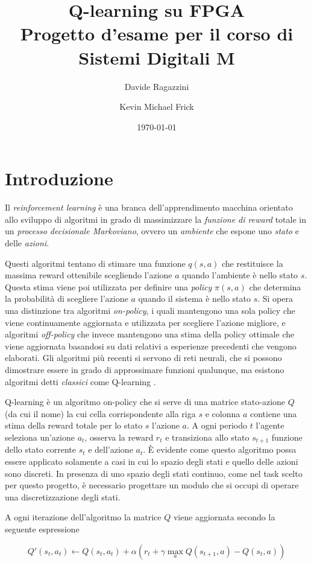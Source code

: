 \documentclass{article}
\title{Q-learning su FPGA \\ Progetto d'esame per il corso di Sistemi Digitali M}
\date{\today}
\author{Davide Ragazzini \and Kevin Michael Frick}
\begin{document}
\maketitle

\section{Introduzione}
Il \emph{reinforcement learning} è una branca dell'apprendimento macchina orientato allo sviluppo di algoritmi in grado di massimizzare la \emph{funzione di reward} totale in un \emph{processo decisionale Markoviano}, ovvero un \emph{ambiente} che espone uno \emph{stato} e delle \emph{azioni}. 

Questi algoritmi tentano di stimare una funzione $q(s, a)$ che restituisce la massima reward ottenibile scegliendo l'azione $a$ quando l'ambiente è nello stato $s$.
Questa stima viene poi utilizzata per definire una \emph{policy} $\pi(s, a)$ che determina la probabilità di scegliere l'azione $a$ quando il sistema è nello stato $s$. 
Si opera una distinzione tra algoritmi \emph{on-policy}, i quali mantengono una sola policy che viene continuamente aggiornata e utilizzata per scegliere l'azione migliore, e algoritmi \emph{off-policy} che invece mantengono una stima della policy ottimale che viene aggiornata basandosi su dati relativi a esperienze precedenti che vengono elaborati. 
Gli algoritmi più recenti si servono di reti neurali, che si possono dimostrare essere in grado di approssimare funzioni qualunque, ma esistono algoritmi detti \emph{classici} come Q-learning \citep{watkins_learning_1989}. 

Q-learning è un algoritmo on-policy che si serve di una matrice stato-azione $Q$ (da cui il nome) la cui cella corrispondente alla riga $s$ e colonna $a$ contiene una stima della reward totale per lo stato $s$ l'azione $a$. 
A ogni periodo $t$ l'agente seleziona un'azione $a_t$, osserva la reward $r_t$ e transiziona allo stato $s_{t + 1}$ funzione dello stato corrente $s_t$ e dell'azione $a_t$. 
È evidente come questo algoritmo possa essere applicato solamente a casi in cui lo spazio degli stati e quello delle azioni sono discreti. 
In presenza di uno spazio degli stati continuo, come nel task scelto per questo progetto, è necessario progettare un modulo che si occupi di operare una discretizzazione degli stati. 

A ogni iterazione dell'algoritmo la matrice $Q$ viene aggiornata secondo la seguente espressione

$$
Q'(s_t, a_t) \leftarrow Q(s_t, a_t) + \alpha (r_t + \gamma \max_a Q(s_{t+1}, a) - Q(s_t, a))
$$
\end{document}
